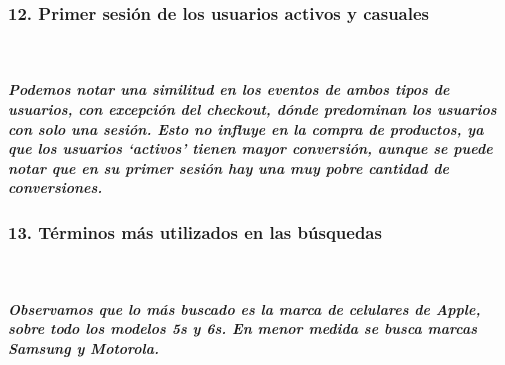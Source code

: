 \documentclass[11pt]{article}
\begin{document}
    \hypertarget{primer-sesiuxf3n-de-los-usuarios-activos-y-casuales}{%
\subsubsection{12. Primer sesión de los usuarios activos y
casuales}\label{primer-sesiuxf3n-de-los-usuarios-activos-y-casuales}}

    \begin{center}
    \end{center}
    { \hspace*{\fill} \\}
    
    \hypertarget{podemos-notar-una-similitud-en-los-eventos-de-ambos-tipos-de-usuarios-con-excepciuxf3n-del-checkout-duxf3nde-predominan-los-usuarios-con-solo-una-sesiuxf3n.-esto-no-influye-en-la-compra-de-productos-ya-que-los-usuarios-activos-tienen-mayor-conversiuxf3n-aunque-se-puede-notar-que-en-su-primer-sesiuxf3n-hay-una-muy-pobre-cantidad-de-conversiones.}{%
\subparagraph{Podemos notar una similitud en los eventos de ambos tipos
de usuarios, con excepción del checkout, dónde predominan los usuarios
con solo una sesión. Esto no influye en la compra de productos, ya que
los usuarios `activos' tienen mayor conversión, aunque se puede notar
que en su primer sesión hay una muy pobre cantidad de
conversiones.}\label{podemos-notar-una-similitud-en-los-eventos-de-ambos-tipos-de-usuarios-con-excepciuxf3n-del-checkout-duxf3nde-predominan-los-usuarios-con-solo-una-sesiuxf3n.-esto-no-influye-en-la-compra-de-productos-ya-que-los-usuarios-activos-tienen-mayor-conversiuxf3n-aunque-se-puede-notar-que-en-su-primer-sesiuxf3n-hay-una-muy-pobre-cantidad-de-conversiones.}}

    \hypertarget{tuxe9rminos-muxe1s-utilizados-en-las-buxfasquedas}{%
\subsubsection{13. Términos más utilizados en las
búsquedas}\label{tuxe9rminos-muxe1s-utilizados-en-las-buxfasquedas}}

    \begin{center}
    \end{center}
    { \hspace*{\fill} \\}
    
    \hypertarget{observamos-que-lo-muxe1s-buscado-es-la-marca-de-celulares-de-apple-sobre-todo-los-modelos-5s-y-6s.-en-menor-medida-se-busca-marcas-samsung-y-motorola.}{%
\subparagraph{Observamos que lo más buscado es la marca de celulares de
Apple, sobre todo los modelos 5s y 6s. En menor medida se busca marcas
Samsung y
Motorola.}\label{observamos-que-lo-muxe1s-buscado-es-la-marca-de-celulares-de-apple-sobre-todo-los-modelos-5s-y-6s.-en-menor-medida-se-busca-marcas-samsung-y-motorola.}}
\end{document}
